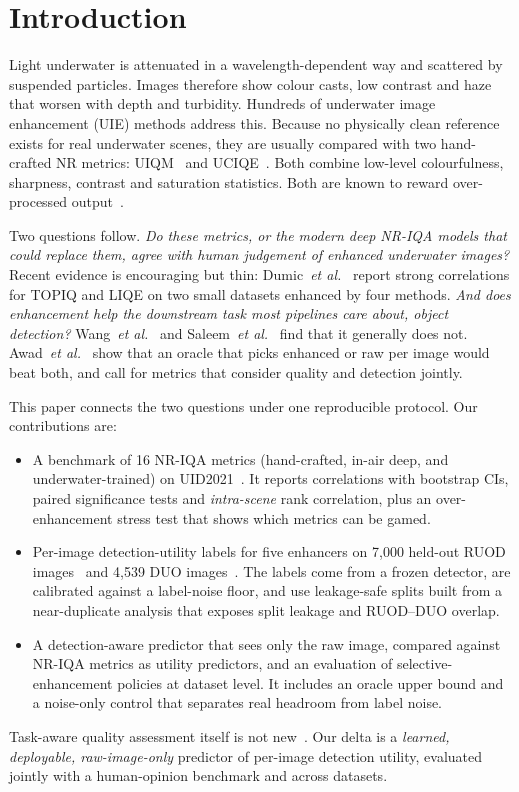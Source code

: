 \documentclass[conference]{IEEEtran}
\begin{document}
\section{Introduction}
Light underwater is attenuated in a wavelength-dependent way and scattered by suspended particles. Images therefore show colour casts, low contrast and haze that worsen with depth and turbidity. Hundreds of underwater image enhancement (UIE) methods address this. Because no physically clean reference exists for real underwater scenes, they are usually compared with two hand-crafted NR metrics: UIQM~\cite{panetta2016uiqm} and UCIQE~\cite{yang2015uciqe}. Both combine low-level colourfulness, sharpness, contrast and saturation statistics. Both are known to reward over-processed output~\cite{li2020uieb,li2022limits}.

Two questions follow. \emph{Do these metrics, or the modern deep NR-IQA models that could replace them, agree with human judgement of enhanced underwater images?} Recent evidence is encouraging but thin: Dumic~\textit{et al.}~\cite{dumic2026reliable} report strong correlations for TOPIQ and LIQE on two small datasets enhanced by four methods. \emph{And does enhancement help the downstream task most pipelines care about, object detection?} Wang~\textit{et al.}~\cite{wang2024isuie} and Saleem~\textit{et al.}~\cite{saleem2025influence} find that it generally does not. Awad~\textit{et al.}~\cite{awad2026revisiting} show that an oracle that picks enhanced or raw per image would beat both, and call for metrics that consider quality and detection jointly.

This paper connects the two questions under one reproducible protocol. Our contributions are:
\begin{itemize}
\item A benchmark of 16 NR-IQA metrics (hand-crafted, in-air deep, and underwater-trained) on UID2021~\cite{hou2023uid2021}. It reports correlations with bootstrap CIs, paired significance tests and \emph{intra-scene} rank correlation, plus an over-enhancement stress test that shows which metrics can be gamed.
\item Per-image detection-utility labels for five enhancers on 7{,}000 held-out RUOD images~\cite{fu2023ruod} and 4{,}539 DUO images~\cite{liu2021duo}. The labels come from a frozen detector, are calibrated against a label-noise floor, and use leakage-safe splits built from a near-duplicate analysis that exposes split leakage and RUOD--DUO overlap.
\item A detection-aware predictor that sees only the raw image, compared against NR-IQA metrics as utility predictors, and an evaluation of selective-enhancement policies at dataset level. It includes an oracle upper bound and a noise-only control that separates real headroom from label noise.
\end{itemize}
Task-aware quality assessment itself is not new~\cite{awad2026revisiting}. Our delta is a \emph{learned, deployable, raw-image-only} predictor of per-image detection utility, evaluated jointly with a human-opinion benchmark and across datasets.
\end{document}
